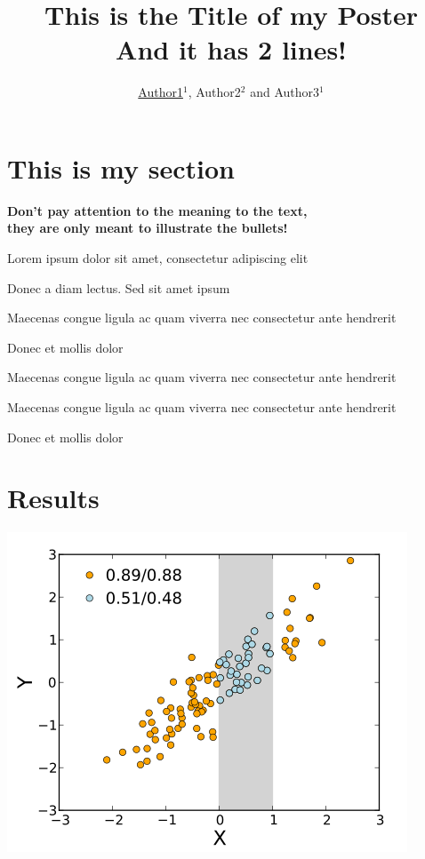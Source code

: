 \documentclass[a0, 30pt]{sciposter}
\title{This is the Title of my Poster \\ And it has 2 lines!}
\author{\underline{Author1}$^1$, Author2$^2$ and Author3$^1$}
\begin{document}

\maketitle


\begin{multicols}{2}
  
  \section{This is my section}
  
  \usualsep
  \begin{center}
    \bf \color{blue} Don't pay attention to the meaning to the text,
    \\ they are only meant to illustrate the bullets!
  \end{center}
  
  \usualsep
   Lorem ipsum dolor sit amet, consectetur adipiscing elit
  
  \usualsep 
   Donec a diam lectus. Sed sit amet ipsum
  
  \usualsep
   Maecenas congue ligula ac quam viverra nec consectetur ante
  hendrerit 
  
  \usualsep
   Donec et mollis dolor
  
  \usualsep
   Maecenas congue ligula ac quam viverra nec consectetur ante
  hendrerit
  
  \usualsep
   Maecenas congue ligula ac quam viverra nec consectetur ante
  hendrerit
  
  \usualsep
   Donec et mollis dolor
  
  \section{Results}
  
  \begin{center}
    \includegraphics[scale = 1.0]{example.png}
  \end{center}
  

\end{multicols}
\end{document}
